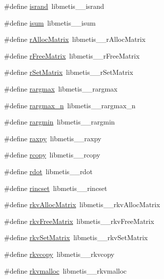\begin{DoxyCompactItemize}
\item 
\#define \hyperlink{a00212_a979bb634b3c7b9380d0382da4bb03a23}{isrand}~libmetis\+\_\+\+\_\+isrand
\item 
\#define \hyperlink{a00212_a4898927c5071354f29c29434d0863ed9}{isum}~libmetis\+\_\+\+\_\+isum
\item 
\#define \hyperlink{a00212_a6b6ccf0ca3d94c3a13f96716b1aaaf39}{r\+Alloc\+Matrix}~libmetis\+\_\+\+\_\+r\+Alloc\+Matrix
\item 
\#define \hyperlink{a00212_a83803c13d4f051fe3742bc922fed4f4a}{r\+Free\+Matrix}~libmetis\+\_\+\+\_\+r\+Free\+Matrix
\item 
\#define \hyperlink{a00212_a4747504c9da669da95b66c7d535dec1d}{r\+Set\+Matrix}~libmetis\+\_\+\+\_\+r\+Set\+Matrix
\item 
\#define \hyperlink{a00212_aca831486bea44e7512d0760719dd74f1}{rargmax}~libmetis\+\_\+\+\_\+rargmax
\item 
\#define \hyperlink{a00212_a72d86da05ca922f2d1a06df04cc570ad}{rargmax\+\_\+n}~libmetis\+\_\+\+\_\+rargmax\+\_\+n
\item 
\#define \hyperlink{a00212_a6b9a44bb0ea214ef55d3bf5310f121e1}{rargmin}~libmetis\+\_\+\+\_\+rargmin
\item 
\#define \hyperlink{a00212_a6264ba6b66bb57c592a19bf863ccd9b4}{raxpy}~libmetis\+\_\+\+\_\+raxpy
\item 
\#define \hyperlink{a00212_a7354fdcac0be90cce82a908089540c32}{rcopy}~libmetis\+\_\+\+\_\+rcopy
\item 
\#define \hyperlink{a00212_a15ada0df526b3b70859ac6df6bfc38fd}{rdot}~libmetis\+\_\+\+\_\+rdot
\item 
\#define \hyperlink{a00212_afbc88edef462ca29e36099f69ffe7a1a}{rincset}~libmetis\+\_\+\+\_\+rincset
\item 
\#define \hyperlink{a00212_aee1f46dac45181650b7ebb6f2703d38b}{rkv\+Alloc\+Matrix}~libmetis\+\_\+\+\_\+rkv\+Alloc\+Matrix
\item 
\#define \hyperlink{a00212_a5d6433536262e4017cfbcdb0d18a90c7}{rkv\+Free\+Matrix}~libmetis\+\_\+\+\_\+rkv\+Free\+Matrix
\item 
\#define \hyperlink{a00212_a8af99497c4fba3432d5a4496e1e646b0}{rkv\+Set\+Matrix}~libmetis\+\_\+\+\_\+rkv\+Set\+Matrix
\item 
\#define \hyperlink{a00212_a5a7f623820742f0e13985152f9c11155}{rkvcopy}~libmetis\+\_\+\+\_\+rkvcopy
\item 
\#define \hyperlink{a00212_aed4e1b14cc496ae7d5cc27de1e8e4086}{rkvmalloc}~libmetis\+\_\+\+\_\+rkvmalloc
\item 

\end{DoxyCompactItemize}
